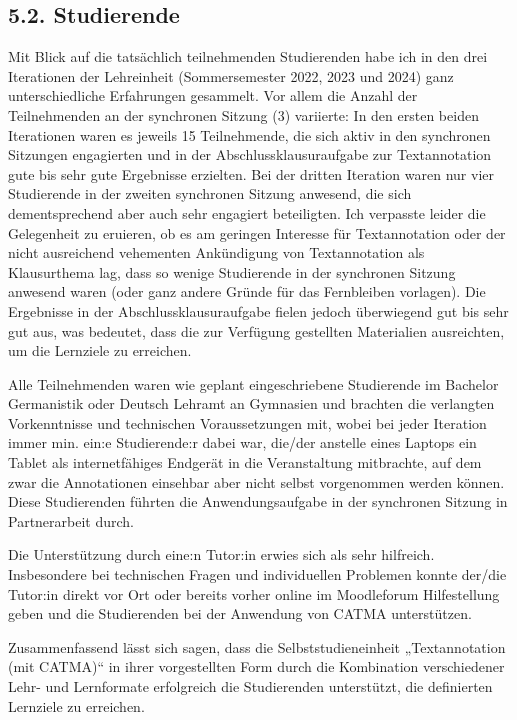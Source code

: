 \documentclass[
          a4paper,
        ]{article}
\begin{document}
\subsection{5.2. Studierende}\label{studierende}

Mit Blick auf die tatsächlich teilnehmenden Studierenden habe ich in den
drei Iterationen der Lehreinheit (Sommersemester 2022, 2023 und 2024)
ganz unterschiedliche Erfahrungen gesammelt. Vor allem die Anzahl der
Teilnehmenden an der synchronen Sitzung (3) variierte: In den ersten
beiden Iterationen waren es jeweils 15 Teilnehmende, die sich aktiv in
den synchronen Sitzungen engagierten und in der Abschlussklausuraufgabe
zur Textannotation gute bis sehr gute Ergebnisse erzielten. Bei der
dritten Iteration waren nur vier Studierende in der zweiten synchronen
Sitzung anwesend, die sich dementsprechend aber auch sehr engagiert
beteiligten. Ich verpasste leider die Gelegenheit zu eruieren, ob es am
geringen Interesse für Textannotation oder der nicht ausreichend
vehementen Ankündigung von Textannotation als Klausurthema lag, dass so
wenige Studierende in der synchronen Sitzung anwesend waren (oder ganz
andere Gründe für das Fernbleiben vorlagen). Die Ergebnisse in der
Abschlussklausuraufgabe fielen jedoch überwiegend gut bis sehr gut aus,
was bedeutet, dass die zur Verfügung gestellten Materialien ausreichten,
um die Lernziele zu erreichen.

Alle Teilnehmenden waren wie geplant eingeschriebene Studierende im
Bachelor Germanistik oder Deutsch Lehramt an Gymnasien und brachten die
verlangten Vorkenntnisse und technischen Voraussetzungen mit, wobei bei
jeder Iteration immer min. ein:e Studierende:r dabei war, die/der
anstelle eines Laptops ein Tablet als internetfähiges Endgerät in die
Veranstaltung mitbrachte, auf dem zwar die Annotationen einsehbar aber
nicht selbst vorgenommen werden können. Diese Studierenden führten die
Anwendungsaufgabe in der synchronen Sitzung in Partnerarbeit durch.

Die Unterstützung durch eine:n Tutor:in erwies sich als sehr hilfreich.
Insbesondere bei technischen Fragen und individuellen Problemen konnte
der/die Tutor:in direkt vor Ort oder bereits vorher online im
Moodleforum Hilfestellung geben und die Studierenden bei der Anwendung
von CATMA unterstützen.

Zusammenfassend lässt sich sagen, dass die Selbststudieneinheit
„Textannotation (mit CATMA)`` in ihrer vorgestellten Form durch die
Kombination verschiedener Lehr- und Lernformate erfolgreich die
Studierenden unterstützt, die definierten Lernziele zu erreichen.
\end{document}
